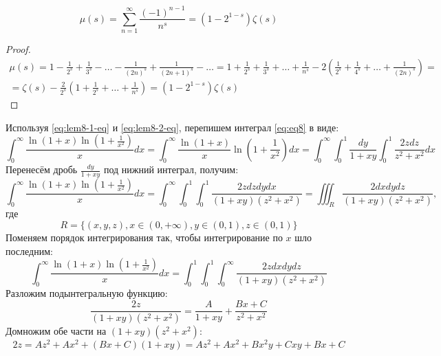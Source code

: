 \documentclass[11pt]{article}
\newcounter{lem}\setcounter{lem}{0}
\def\lm{\par\smallskip\refstepcounter{lem}\textbf{\arabic{lem}}}
\newtheorem*{Lemma}{Лемма \lm}
\newcounter{th}\setcounter{th}{0}
\begin{document}
\begin{Lemma}\label{lem:8-4}
\begin{equation}\label{eq:lem8-4-eq}
\mu(s) = \sum_{n = 1}^{\infty}\frac{(-1)^{n - 1}}{n^s} = (1 - 2^{1 - s})\zeta(s)
\end{equation}
\end{Lemma}
\begin{proof}
\begin{multline*}
\mu(s) = 1 - \frac1{2^s} + \frac1{3^s} - \ldots - \frac1{(2n)^s} + \frac1{(2n + 1)^s} - \ldots = 1 + \frac1{2^s} + \frac1{3^s} + \ldots + \frac1{n^s} - 2\left(\frac1{2^s} + \frac1{4^s} + \ldots + \frac1{(2n)^s}\right) = \\
= \zeta(s) - \frac2{2^s}\left(1 + \frac1{2^s} + \ldots + \frac1{n^s}\right) = (1 - 2^{1 - s})\zeta(s)
\end{multline*}
\end{proof}
Используя \ref{eq:lem8-1-eq} и \ref{eq:lem8-2-eq}, перепишем интеграл \eqref{eq:eq8} в виде:
\begin{equation*}
\int_0^{\infty}\frac{\ln(1 + x)\ln\left(1 + \frac1{x^2}\right)}xdx = \int_0^{\infty}\frac{\ln(1 + x)}x\ln\left(1 + \frac1{x^2}\right)dx = \int_0^{\infty}\int_0^1\frac{dy}{1 + xy}\int_0^1\frac{2zdz}{z^2 + x^2}dx
\end{equation*}
Перенесём дробь $\frac{dy}{1 + xy}$ под нижний интеграл, получим:
\begin{equation*}
\int_0^{\infty}\frac{\ln(1 + x)\ln\left(1 + \frac1{x^2}\right)}xdx = \int_0^{\infty}\int_0^1\int_0^1\frac{2zdzdydx}{(1 + xy)(z^2 + x^2)} = \iiint_R\frac{2dxdydz}{(1 + xy)(z^2 + x^2)},
\end{equation*}
где
\begin{equation*}
R = \{(x, y, z), x \in (0, +\infty), y \in (0, 1), z \in (0, 1)\}
\end{equation*}
Поменяем порядок интегрирования так, чтобы интегрирование по $x$ шло последним:
\begin{equation}\label{eq:eq8-6}
\int_0^{\infty}\frac{\ln(1 + x)\ln\left(1 + \frac1{x^2}\right)}xdx = \int_0^1\int_0^1\int_0^{\infty}\frac{2zdxdydz}{(1 + xy)(z^2 + x^2)}
\end{equation}
Разложим подынтегральную функцию:
\begin{equation*}
\frac{2z}{(1 + xy)(z^2 + x^2)} = \frac{A}{1 + xy} + \frac{Bx + C}{z^2 + x^2}
\end{equation*}
Домножим обе части на $(1 + xy)(z^2 + x^2)$:
\begin{equation*}
2z = Az^2 + Ax^2 + (Bx + C)(1 + xy) = Az^2 + Ax^2 + Bx^2y + Cxy + Bx + C
\end{equation*}
\end{document}
